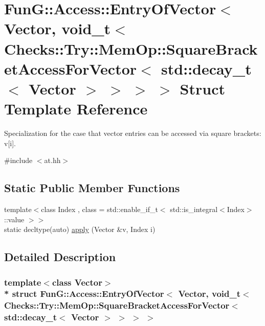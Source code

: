 \hypertarget{structFunG_1_1Access_1_1EntryOfVector_3_01Vector_00_01void__t_3_01Checks_1_1Try_1_1MemOp_1_1Squaa9733f1e90025a89b1e2cfa7d151d247}{}\section{FunG\+:\+:Access\+:\+:Entry\+Of\+Vector$<$ Vector, void\+\_\+t$<$ Checks\+:\+:Try\+:\+:Mem\+Op\+:\+:Square\+Bracket\+Access\+For\+Vector$<$ std\+:\+:decay\+\_\+t$<$ Vector $>$ $>$ $>$ $>$ Struct Template Reference}
\label{structFunG_1_1Access_1_1EntryOfVector_3_01Vector_00_01void__t_3_01Checks_1_1Try_1_1MemOp_1_1Squaa9733f1e90025a89b1e2cfa7d151d247}


Specialization for the case that vector entries can be accessed via square brackets\+: v\mbox{[}i\mbox{]}.  




{\ttfamily \#include $<$at.\+hh$>$}

\subsection*{Static Public Member Functions}
\begin{DoxyCompactItemize}
\item 
{\footnotesize template$<$class Index , class  = std\+::enable\+\_\+if\+\_\+t$<$ std\+::is\+\_\+integral$<$\+Index$>$\+::value $>$$>$ }\\static decltype(auto) \hyperlink{structFunG_1_1Access_1_1EntryOfVector_3_01Vector_00_01void__t_3_01Checks_1_1Try_1_1MemOp_1_1Squaa9733f1e90025a89b1e2cfa7d151d247_a928cd4f399e8fb762e1cc540c4c6b86f}{apply} (Vector \&v, Index i)
\end{DoxyCompactItemize}


\subsection{Detailed Description}
\subsubsection*{template$<$class Vector$>$\\*
struct Fun\+G\+::\+Access\+::\+Entry\+Of\+Vector$<$ Vector, void\+\_\+t$<$ Checks\+::\+Try\+::\+Mem\+Op\+::\+Square\+Bracket\+Access\+For\+Vector$<$ std\+::decay\+\_\+t$<$ Vector $>$ $>$ $>$ $>$}

